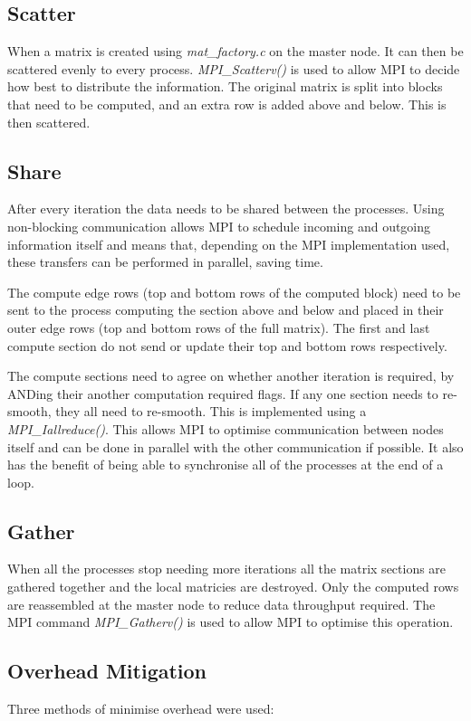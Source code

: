 \documentclass[a4paper,10pt]{report}
\begin{document}
\subsection{Scatter}
When a matrix is created using \emph{mat\_factory.c} on the master node. It can then be scattered evenly to every process. \emph{MPI\_Scatterv()} is used to allow MPI to decide how best to distribute the information. The original matrix is split into blocks that need to be computed, and an extra row is added above and below. This is then scattered.
\subsection{Share}
After every iteration the data needs to be shared between the processes. Using non-blocking communication allows MPI to schedule incoming and outgoing information itself and means that, depending on the MPI implementation used, these transfers can be performed in parallel, saving time.\par
The compute edge rows (top and bottom rows of the computed block) need to be sent to the process computing the section above and below and placed in their outer edge rows (top and bottom rows of the full matrix). The first and last compute section do not send or update their top and bottom rows respectively.\par
The compute sections need to agree on whether another iteration is required, by ANDing their another computation required flags. If any one section needs to re-smooth, they all need to re-smooth. This is implemented using a \emph{MPI\_Iallreduce()}. This allows MPI to optimise communication between nodes itself and can be done in parallel with the other communication if possible. It also has the benefit of being able to synchronise all of the processes at the end of a loop.
\subsection{Gather}
When all the processes stop needing more iterations all the matrix sections are gathered together and the local matricies are destroyed. Only the computed rows are reassembled at the master node to reduce data throughput required. The MPI command \emph{MPI\_Gatherv()} is used to allow MPI to optimise this operation.
\subsection{Overhead Mitigation}
Three methods of minimise overhead were used:
\end{document}
